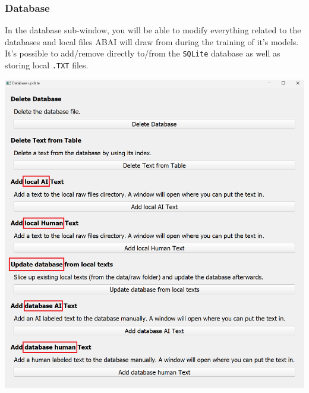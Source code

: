\subsubsection{Database}
\label{subsubsec:database}
In the database sub-window, you will be able to modify everything related to the databases and local files ABAI will draw from during the training of it's models. It's possible to add/remove directly to/from the \texttt{SQLite} database as well as storing local \texttt{.TXT} files. 
\begin{center}
    \includegraphics[width=17cm]{Images/Usage/Local/DatabaseWindow.png}
\end{center}
\clearpage
